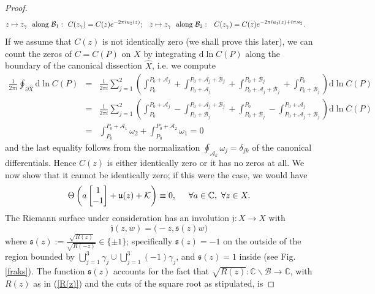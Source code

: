 \documentclass[10pt,oneside,reqno]{amsart}
\numberwithin{equation}{section}
\renewcommand{\d}{{\mathrm d}}
\def\eqref#1{(\ref{#1})}
\begin{document}
\begin{proof}
\begin{align*}
 z\mapsto z_{\gamma}\ \ \textnormal{along}\ \mathcal{B}_1:\ \ & C(z_{\gamma})= C(z)e^{-2\pi iu_2(z)};&&
  z\mapsto z_{\gamma}\ \ \textnormal{along}\ \mathcal{B}_2: && C(z_{\gamma})=C(z)e^{-2\pi iu_1(z)+i\pi\varkappa_2}.
\end{align*}
If we assume that $C(z)$ is not identically zero (we shall prove this later), we can count the zeros of $C=C(P)$ on $X$ by integrating $\d\ln C(P)$ along the boundary of the canonical dissection $\hat{X}$,
i.e. we compute
\begin{eqnarray*}
  \frac{1}{2\pi i}\oint_{\partial\hat{X}}\d\ln C(P) &=&\frac{1}{2\pi i}\sum_{j=1}^2\left(\int_{P_0}^{P_0+\mathcal{A}_j}+\int_{P_0+\mathcal{A}_j}^{P_0+\mathcal{A}_j+\mathcal{B}_j}
+\int_{P_0+\mathcal{A}_j+\mathcal{B}_j}^{P_0+\mathcal{B}_j}+\int_{P_0+\mathcal{B}_j}^{P_0}\right)\d\ln C(P)\\
 &=&\frac{1}{2\pi i}\sum_{j=1}^2\left(\int_{P_0}^{P_0+\mathcal{A}_j}-\int_{P_0+\mathcal{B}_j}^{P_0+\mathcal{A}_j+\mathcal{B}_j}+\int_{P_0+\mathcal{B}_j}^{P_0}-
\int_{P_0+\mathcal{A}_j+\mathcal{B}_j}^{P_0+\mathcal{A}_j}\right)\d\ln C(P)\\
&=&\int_{P_0}^{P_0+\mathcal{A}_1}\omega_2+\int_{P_0}^{P_0+\mathcal{A}_2}\omega_1 =0
\end{eqnarray*}
and the last equality follows from the normalization $\oint_{\mathcal{A}_k}\omega_j=\delta_{jk}$ of the canonical differentials. Hence $C(z)$ is either identically zero or 
it has no zeros at all. We now show that it cannot be identically zero; if this were the case,  we would have
\begin{equation}\label{as1}
 \Theta\left(a\begin{bmatrix}
                                                       1\\
-1\\
                                                      \end{bmatrix}+\mathfrak{u}(z)+\mathcal{K}\right)\equiv 0,\hspace{0.5cm}\forall a\in\mathbb{C},\ \forall z\in X.
\end{equation}
The Riemann surface under consideration has an involution $\mathfrak{j}:X\rightarrow X$ with
\begin{equation*}
  \mathfrak{j}(z,w) = \big(-z,\mathfrak{s}(z)w\big)
\end{equation*}
where $\mathfrak{s}(z):= \frac {\sqrt{R(z)}}{\sqrt{R(-z)}} \in\{\pm 1\}$; specifically  $\mathfrak s(z) =-1$ on the outside of the region bounded by $\bigcup_{j=1}^3 \gamma_j \cup \bigcup_{j=1}^3 (-1)\gamma_j$, and $\mathfrak s(z) =1$ inside (see Fig. \ref{fraks}). The function $\mathfrak{s}(z)$ accounts for the fact that $\sqrt{R(z)}:\mathbb{C}\backslash\mathcal{B}\rightarrow\mathbb{C}$, with $R(z)$ as in \eqref{R(z)} and the cuts of the square root as stipulated, is 

\end{proof}
\end{document}
